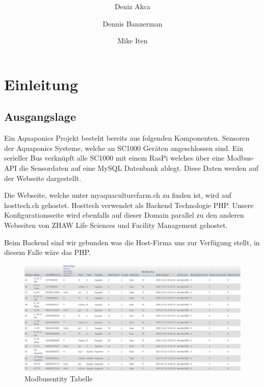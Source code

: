 \documentclass[a4paper]{article}
\author{
	Deniz Akca
	\and
	Dennis Bannerman
	\and
	Mike Iten
}
\affil{ZHAW - Zurich}
\title{
	\Huge{}\color{blue}\textbf{\project}\\ 
	\vspace{2cm}
	\large{}\color{black}\textbf{\outline}
}
\begin{document}
	\sloppy
	
	\begin{titlepage}
		\maketitle
		\thispagestyle{empty}
	\end{titlepage}
	
	\tableofcontents
	\newpage
	
	\fussy
	

		
	\section{Einleitung}
	
	\subsection{Ausgangslage}
	Ein Aquaponics Projekt besteht bereits aus folgenden Komponenten. Sensoren der Aquaponics Systeme, welche an SC1000 Geräten angeschlossen sind. 
	Ein serieller Bus verknüpft alle SC1000 mit einem RasPi welches über eine Modbus-API die Sensordaten auf eine MySQL Datenbank ablegt. Diese Daten werden auf der Webseite dargestellt.
	

	Die Webseite, welche unter myaquaculturefarm.ch zu finden ist, wird auf hosttech.ch gehostet. Hosttech verwendet als Backend Technologie PHP.
	Unsere Konfigurationsseite wird ebenfalls auf dieser Domain parallel zu den anderen Webseiten von ZHAW Life Sciences und Facility Management gehostet.
	
	Beim Backend sind wir gebunden was die Host-Firma uns zur Verfügung stellt, in diesem Falle wäre das PHP.
	
	\begin{figure}[h]
		\centering
		\includegraphics[scale=0.5]{Modbusentity}
		\caption{Modbusentity Tabelle}
		\label{fig:Modbusentity}
	\end{figure}
	
\end{document}

